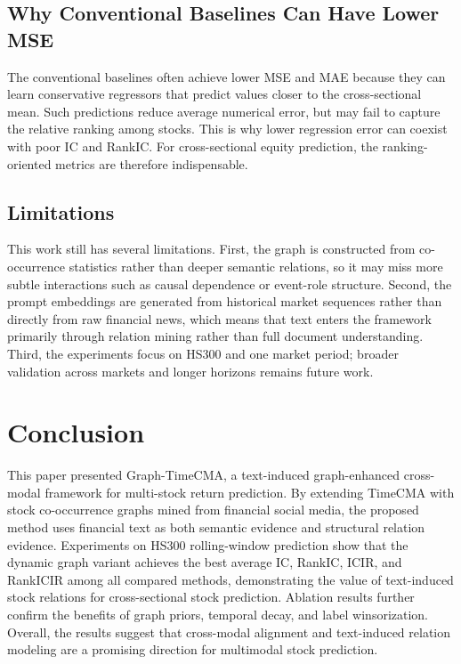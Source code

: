 \documentclass[runningheads]{llncs}
\begin{document}
\subsection{Why Conventional Baselines Can Have Lower MSE}

The conventional baselines often achieve lower MSE and MAE because they can learn conservative regressors that predict values closer to the cross-sectional mean. Such predictions reduce average numerical error, but may fail to capture the relative ranking among stocks. This is why lower regression error can coexist with poor IC and RankIC. For cross-sectional equity prediction, the ranking-oriented metrics are therefore indispensable.

\subsection{Limitations}

This work still has several limitations. First, the graph is constructed from co-occurrence statistics rather than deeper semantic relations, so it may miss more subtle interactions such as causal dependence or event-role structure. Second, the prompt embeddings are generated from historical market sequences rather than directly from raw financial news, which means that text enters the framework primarily through relation mining rather than full document understanding. Third, the experiments focus on HS300 and one market period; broader validation across markets and longer horizons remains future work.

\section{Conclusion}

This paper presented Graph-TimeCMA, a text-induced graph-enhanced cross-modal framework for multi-stock return prediction. By extending TimeCMA with stock co-occurrence graphs mined from financial social media, the proposed method uses financial text as both semantic evidence and structural relation evidence. Experiments on HS300 rolling-window prediction show that the dynamic graph variant achieves the best average IC, RankIC, ICIR, and RankICIR among all compared methods, demonstrating the value of text-induced stock relations for cross-sectional stock prediction. Ablation results further confirm the benefits of graph priors, temporal decay, and label winsorization. Overall, the results suggest that cross-modal alignment and text-induced relation modeling are a promising direction for multimodal stock prediction.



\end{document}
